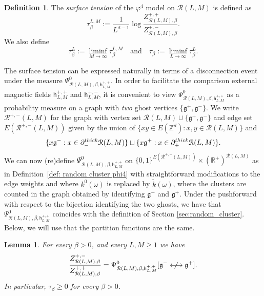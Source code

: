 \documentclass[11pt,a4paper]{article}
\newtheorem{lemma}[theorem]{Lemma}
\theoremstyle{definition}
\newtheorem{definition}[theorem]{Definition}
\numberwithin{equation}{section}
\newcommand\fg{\mathfrak{g}}
\begin{document}
\begin{definition}
The \emph{surface tension} of the $\varphi^4$ model on $\mathcal R(L,M)$ is defined as 
\begin{equation}
    \tau_{\beta}^{L,M}:=\frac{1}{L^{d-1}}\log \frac{Z^{+,+}_{\mathcal{R}(L,M),\beta}}{Z^{+,-}_{\mathcal{R}(L,M),\beta}}.
\end{equation}
We also define 
\begin{equation}
\tau_{\beta}^L:=\liminf_{M\to\infty}\tau_{\beta}^{L,M} \quad \text{and} \quad \tau_{\beta}:=\liminf_{L\to\infty}\tau_{\beta}^{L}.
\end{equation}
\end{definition}
The surface tension can be expressed naturally in terms of a disconnection event under the measure $\Psi^{0}_{\mathcal R(L,M),\beta,\mathsf{h}^{+,+}_{L,M}}$. In order to facilitate the comparison external magnetic fields $\mathsf h^{+,+}_{L,M}$ and $\mathsf h^{+,-}_{L,M}$, it is convenient to view $\Psi^{0}_{\mathcal R(L,M),\beta,\mathsf{h}^{+,+}_{L,M}}$ as a probability measure on a graph with \emph{two} ghost vertices $\{\mathfrak g^+,\mathfrak g^-\}$. We write $\mathcal{R}^{+,-}(L,M)$ for the graph with vertex set $\mathcal R(L,M)\cup \{\fg^{+},\fg^{-}\}$ and edge set $E(\mathcal{R}^{+,-}(L,M))$ given by the union of $\{xy\in E(\mathbb{Z}^d): x,y\in \mathcal R(L,M)\}$ and
\begin{equation}
\{x\fg^{-} : x\in \partial^{\rm thick}_- \mathcal R(L,M)\}\sqcup \{x\fg^{+}: x\in \partial^{\rm thick}_+ \mathcal R(L,M)\}.    
\end{equation}
We can now (re)define $\Psi^0_{\mathcal R(L,M), \beta, \mathsf h^{+,+}_{L,M}}$ on $\{0,1\}^{E(\mathcal{R}^{+,-}(L,M))}\times (\mathbb R^+)^{\mathcal{R}(L,M)}$ as in Definition~\ref{def: random cluster phi4} with straightforward modifications to the edge weights and where $k^0(\omega)$ is replaced by $\tilde k(\omega)$, where the clusters are counted in the graph obtained by identifying $\mathfrak g^-$ and $\mathfrak g^+$. Under the pushforward with respect to the bijection identifying the two ghosts, we have that $\Psi^0_{\mathcal R(L,M), \beta, \mathsf h^{+,+}_{L,M}}$ coincides with the definition of Section \ref{sec:random_cluster}. Below, we will use that the partition functions are the same.



\begin{lemma}\label{lem: ratio probablistic expression} 
For every $\beta>0$, and every $L,M\geq 1$ we have
\begin{equation}\label{eq: ratio probabilistic expression}
\frac{Z^{+,-}_{\mathcal{R}(L,M),\beta}}{Z^{+,+}_{\mathcal{R}(L,M),\beta}}= \Psi^{0}_{\mathcal R(L,M),\beta,\mathsf{h}^{+,+}_{L,M}}[\fg^{-} \centernot\longleftrightarrow \fg^{+}].
\end{equation}
In particular, $\tau_{\beta}\geq 0$ for every $\beta>0$.
\end{lemma}
\end{document}
